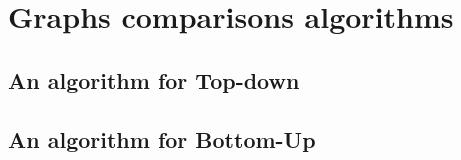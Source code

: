 \chapter{Graphs comparisons algorithms}
\label{cha:Algorithms}

\section{An algorithm for Top-down }
\label{sec:topdown}

\section{An algorithm for Bottom-Up}
